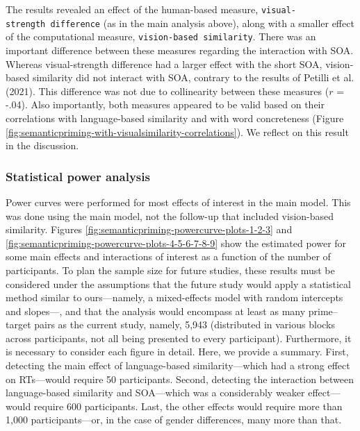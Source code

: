 \documentclass[
  12pt,
  man,floatsintext]{apa7}
\begin{document}
The results revealed an effect of the human-based measure, \texttt{visual-strength\ difference} (as in the main analysis above), along with a smaller effect of the computational measure, \texttt{vision-based\ similarity}. There was an important difference between these measures regarding the interaction with SOA. Whereas visual-strength difference had a larger effect with the short SOA, vision-based similarity did not interact with SOA, contrary to the results of Petilli et al. (2021). This difference was not due to collinearity between these measures (\(r\) = -.04). Also importantly, both measures appeared to be valid based on their correlations with language-based similarity and with word concreteness (Figure \ref{fig:semanticpriming-with-visualsimilarity-correlations}). We reflect on this result in the discussion.

\hypertarget{statistical-power-analysis-2}{%
\subsubsection{Statistical power analysis}\label{statistical-power-analysis-2}}

Power curves were performed for most effects of interest in the main model. This was done using the main model, not the follow-up that included vision-based similarity. Figures \ref{fig:semanticpriming-powercurve-plots-1-2-3} and \ref{fig:semanticpriming-powercurve-plots-4-5-6-7-8-9} show the estimated power for some main effects and interactions of interest as a function of the number of participants. To plan the sample size for future studies, these results must be considered under the assumptions that the future study would apply a statistical method similar to ours---namely, a mixed-effects model with random intercepts and slopes---, and that the analysis would encompass at least as many prime--target pairs as the current study, namely, 5,943 (distributed in various blocks across participants, not all being presented to every participant). Furthermore, it is necessary to consider each figure in detail. Here, we provide a summary. First, detecting the main effect of language-based similarity---which had a strong effect on RTs---would require 50 participants. Second, detecting the interaction between language-based similarity and SOA---which was a considerably weaker effect---would require 600 participants. Last, the other effects would require more than 1,000 participants---or, in the case of gender differences, many more than that.
\end{document}
